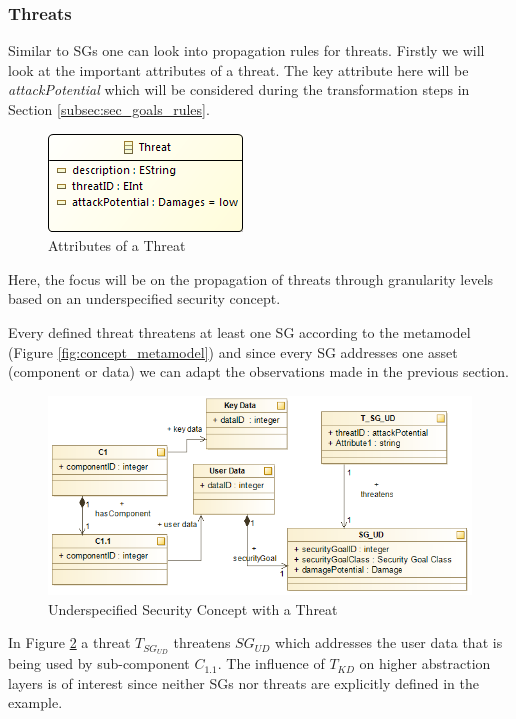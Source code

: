 \subsubsection*{Threats}

Similar to SGs one can look into propagation rules for threats. Firstly we will look at the important attributes of a threat. The key attribute here will be \textit{attackPotential} which will be considered during the transformation steps in Section \ref{subsec:sec_goals_rules}.  
 
\begin{figure}[H]
\centering
\includegraphics[scale=0.85]{pictures/threat.png}
\caption{Attributes of a Threat}
\label{fig:threat}
\end{figure} 

Here, the focus will be on the propagation of threats through granularity levels based on an underspecified security concept.

Every defined threat threatens at least one SG according to the metamodel (Figure \ref{fig:concept_metamodel}) and since every SG addresses one asset (component or data) we can adapt the observations made in the previous section. 

\begin{figure}[H]
\centering
\includegraphics[scale=0.85]{pictures/threat_overview.png}
\caption{Underspecified Security Concept with a Threat}
\label{fig:threat_overview}
\end{figure} 

In Figure \ref{fig:threat_overview} a threat $T_{SG_{UD}}$ threatens $SG_{UD}$ which addresses the user data that is being used by sub-component $C_{1.1}$. The influence of $T_{KD}$ on higher abstraction layers is of interest since neither SGs nor threats are explicitly defined in the example.

